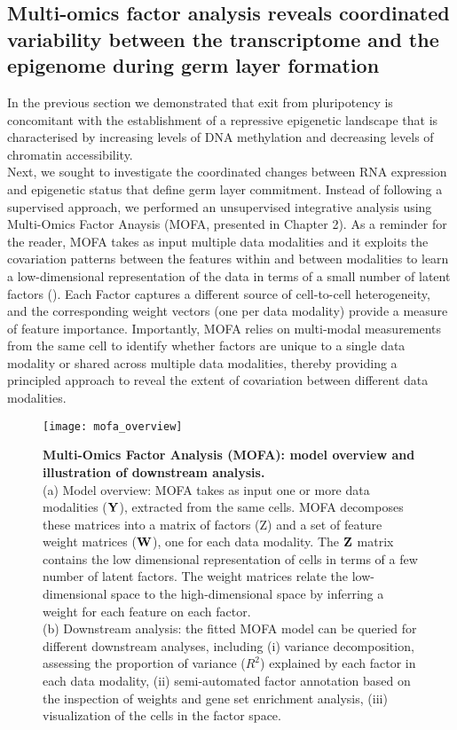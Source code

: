 \subsection{Multi-omics factor analysis reveals coordinated variability between the transcriptome and the epigenome during germ layer formation} \label{section:mofa_gastrulation}

In the previous section we demonstrated that exit from pluripotency is concomitant with the establishment of a repressive epigenetic landscape that is characterised by increasing levels of DNA methylation and decreasing levels of chromatin accessibility. \\
Next, we sought to investigate the coordinated changes between RNA expression and epigenetic status that define germ layer commitment. Instead of following a supervised approach, we performed an unsupervised integrative analysis using Multi-Omics Factor Anaysis (MOFA, presented in Chapter 2). As a reminder for the reader, MOFA takes as input multiple data modalities and it exploits the covariation patterns between the features within and between modalities to learn a low-dimensional representation of the data in terms of a small number of latent factors (). Each Factor captures a different source of cell-to-cell heterogeneity, and the corresponding weight vectors (one per data modality) provide a measure of feature importance. Importantly, MOFA relies on multi-modal measurements from the same cell to identify whether factors are unique to a single data modality or shared across multiple data modalities, thereby providing a principled approach to reveal the extent of covariation between different data modalities.

\begin{figure}[H]
	\texttt{[image: mofa\_overview]}
	\caption{
	\textbf{Multi-Omics Factor Analysis (MOFA): model overview and illustration of downstream analysis.} \\
	(a) Model overview: MOFA takes as input one or more data modalities (${\bf Y}$), extracted from the same cells. MOFA decomposes these matrices into a matrix of factors (Z) and a set of feature weight matrices (${\bf W}$), one for each data modality. The ${\bf Z}$ matrix contains the low dimensional representation of cells in terms of a few number of latent factors. The weight matrices relate the low-dimensional space to the high-dimensional space by inferring a weight for each feature on each factor. \\
	(b) Downstream analysis: the fitted MOFA model can be queried for different downstream analyses, including (i) variance decomposition, assessing the proportion of variance ($R^2$) explained by each factor in each data modality, (ii) semi-automated factor annotation based on the inspection of weights and gene set enrichment analysis, (iii) visualization of the cells in the factor space. 
	}
	\label{fig:mofa_overview}
\end{figure}

